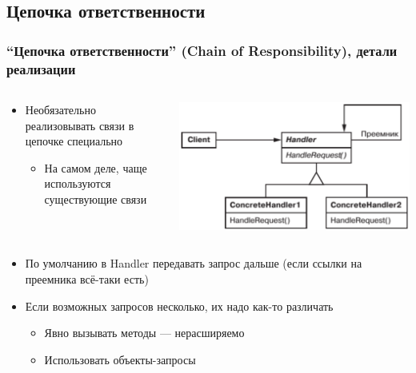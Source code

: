 \documentclass[xetex,mathserif,serif]{beamer}
\begin{document}
    \subsection{Цепочка ответственности}

    \begin{frame}
        \frametitle{``Цепочка ответственности'' (Chain of Responsibility), детали реализации}
        \begin{columns}
            \begin{column}{0.5\textwidth}
                \begin{itemize}
                    \item Необязательно реализовывать связи в цепочке специально
                    \begin{itemize}
                        \item На самом деле, чаще используются существующие связи
                    \end{itemize}

                \end{itemize}
            \end{column}
            \begin{column}{0.5\textwidth}
                \begin{center}
                    \includegraphics[width=\textwidth]{chainOfResponsibility.png}
                \end{center}
            \end{column}
        \end{columns}
        \begin{itemize}
            \item По умолчанию в Handler передавать запрос дальше (если ссылки на преемника всё-таки есть)
            \item Если возможных запросов несколько, их надо как-то различать
            \begin{itemize}
                \item Явно вызывать методы --- нерасширяемо
                \item Использовать объекты-запросы
            \end{itemize}
        \end{itemize}
    \end{frame}
\end{document}
